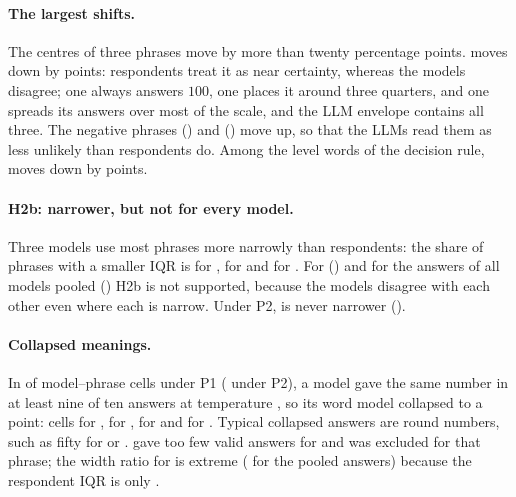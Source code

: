 \paragraph{The largest shifts.}
The centres of three phrases move by more than twenty percentage points.
 moves down by \WtwoCentroidShiftItTwoWillHappenLlmItTwoFull{} points: respondents treat it as near
certainty, whereas the models disagree; one always answers $100$, one places it around three quarters, and one spreads
its answers over most of the scale, and the LLM envelope contains all three.
The negative phrases  (\WtwoCentroidShiftItTwoImprobableLlmItTwoFull{}) and 
(\WtwoCentroidShiftItTwoHighlyUnlikelyLlmItTwoFull{}) move up, so that the LLMs read them as less unlikely than
respondents do.
Among the level words of the decision rule,  moves down by \WtwoCentroidShiftItTwoLikelyLlmItTwoFull{} points.

\paragraph{H2b: narrower, but not for every model.}
Three models use most phrases more narrowly than respondents: the share of phrases with a smaller IQR is
\WtwoHTwoBShareAllGemmaTwoNineBFull{} for \WModelGemmaTwoNineB{}, \WtwoHTwoBShareAllMistralSevenBFull{} for
\WModelMistralSevenB{} and \WtwoHTwoBShareAllQwenTwoFiveSevenBFull{} for \WModelQwenTwoFiveSevenB{}.
For \WModelLlamaThreeOneEightB{} (\WtwoHTwoBShareAllLlamaThreeOneEightBFull{}) and for the answers of all models pooled
(\WtwoHTwoBShareAllPooledLlmFull{}) H2b is not supported, because the models disagree with each other even where each is
narrow.
Under P2, \WModelLlamaThreeOneEightB{} is never narrower (\WtwoPtwoHTwoBShareAllLlamaThreeOneEightBFull{}).

\paragraph{Collapsed meanings.}
In \WtwoCollapsesPOne{} of \WtwoCellsPOne{} model--phrase cells under P1 (\WtwoCollapsesPTwo{} under P2), a model gave the
same number in at least nine of ten answers at temperature \WTemperature{}, so its word model collapsed to a point:
\WtwoCollapsesPOneMistralSevenB{} cells for \WModelMistralSevenB{}, \WtwoCollapsesPOneQwenTwoFiveSevenB{} for
\WModelQwenTwoFiveSevenB{}, \WtwoCollapsesPOneGemmaTwoNineB{} for \WModelGemmaTwoNineB{} and
\WtwoCollapsesPOneLlamaThreeOneEightB{} for \WModelLlamaThreeOneEightB{}.
Typical collapsed answers are round numbers, such as fifty for  or .
\WModelMistralSevenB{} gave too few valid answers for  and was excluded for that phrase; the width ratio
for  is extreme (\WtwoWidthRatioWillHappenPooledLlm{} for the pooled answers) because the respondent IQR
is only \WtwoCitizenIqrWillHappenCitizen{}.

